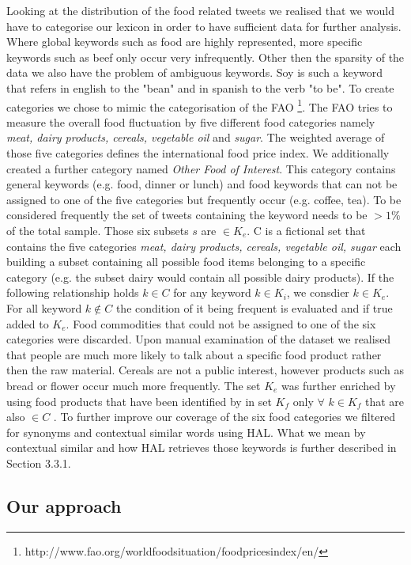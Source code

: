 \documentclass[12pt]{report}
\begin{document}
Looking at the distribution of the food related tweets we realised that we would have to categorise our lexicon in order to have sufficient data for further analysis. Where global keywords such as food are highly represented, more specific keywords such as beef only occur very infrequently. Other then the sparsity of the data we also have the problem of ambiguous keywords. Soy is such a keyword that refers in english to the "bean" and in spanish to the verb "to be". To create categories we chose to mimic the categorisation of the FAO  \footnote{http://www.fao.org/worldfoodsituation/foodpricesindex/en/}. The FAO tries to measure the overall food fluctuation by five different food categories namely \emph{meat, dairy products, cereals, vegetable oil} and \emph {sugar}. The weighted average of those five categories defines the international food price index. We additionally created a further category named \emph{Other Food of Interest}. This category contains general keywords (e.g. food, dinner or lunch) and food keywords that can not be assigned to one of the five categories but frequently occur (e.g. coffee, tea). To be considered frequently the set of tweets containing the keyword needs to be $> 1\%$ of the total sample. Those six subsets  $s$ are $\in K_e$. C is a fictional set that contains the five categories \emph{meat, dairy products, cereals, vegetable oil, sugar}  each building a subset containing all possible food items belonging to a specific category (e.g. the subset dairy would contain all possible dairy products). If the following relationship holds  $k \in C$ for any  keyword $k \in K_i$, we consdier $k \in K_e$. For all keyword $k \notin C$ the condition of it being frequent is evaluated and if true added to $K_e$.  Food commodities that could not be assigned to one of the six categories were discarded. Upon manual examination of the dataset we realised that people are much more likely to talk about a specific food product rather then the raw material. Cereals are not a public interest, however products such as bread or flower occur much more frequently. The set $K_e$  was further enriched by using food products that have been identified by \cite{AbbarMW14} in set $K_f$ only $\forall$ $k   \in K_f$ that are also $\in C$ . To further improve our coverage of the six food categories we filtered for synonyms and contextual similar words using HAL. What we mean by contextual similar and how HAL retrieves those keywords is further described in Section 3.3.1.

\subsection{Our approach}
\end{document}
